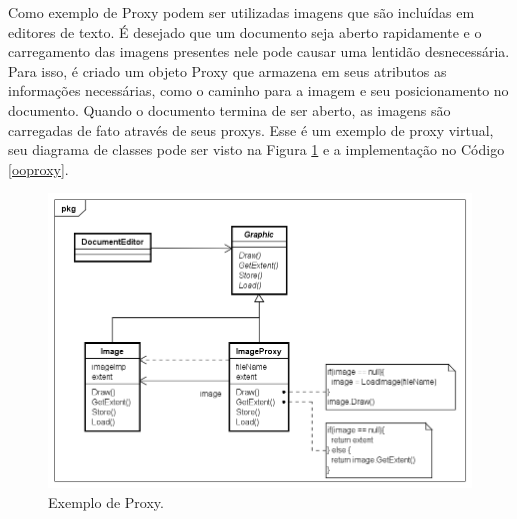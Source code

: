 Como exemplo de Proxy podem ser utilizadas 
imagens que são incluídas em editores de 
texto. É desejado que um documento seja aberto 
rapidamente e o carregamento das imagens 
presentes nele pode causar uma lentidão 
desnecessária. Para isso, é criado um objeto 
Proxy que armazena em seus atributos as 
informações necessárias, como o caminho 
para a imagem e seu posicionamento no 
documento. Quando o documento termina de 
ser aberto, as imagens são carregadas de 
fato através de seus proxys. Esse é um 
exemplo de proxy virtual, seu diagrama de 
classes pode ser visto na Figura \ref{proxy_exemplo} 
e a implementação no Código \ref{ooproxy}.

\begin{figure}[htb]
	\caption{\label{proxy_exemplo}Exemplo de Proxy.}
	\begin{center}
	    \includegraphics[scale=0.5]{5_padroes-contexto-funcional/5.2_estruturais/5.2.7_proxy/proxy_exemplo.png}
	\end{center}
\end{figure}

